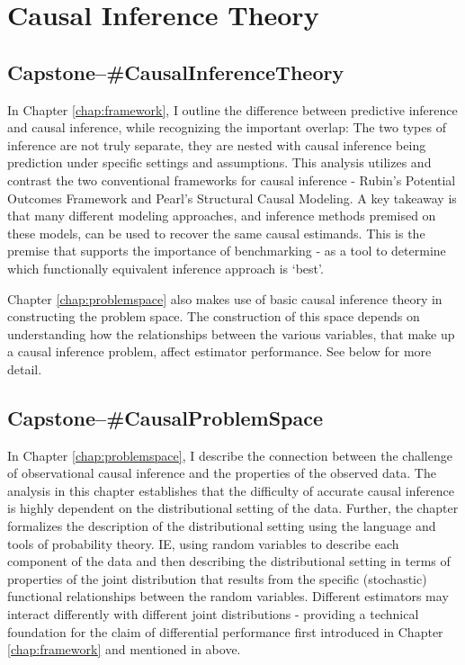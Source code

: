 \documentclass[../main.tex]{subfiles}
\begin{document}
\section{Causal Inference Theory}

\subsection*{\textbf{Capstone--\#CausalInferenceTheory}}
\label{lo:CausalInferenceTheory}

In Chapter \ref{chap:framework}, I outline the difference between predictive inference and causal inference, while recognizing the important overlap: The two types of inference are not truly separate, they are nested with causal inference being prediction under specific settings and assumptions. This analysis utilizes and contrast the two conventional frameworks for causal inference - Rubin’s Potential Outcomes Framework and Pearl’s Structural Causal Modeling. A key takeaway is that many different modeling approaches, and inference methods premised on these models, can be used to recover the same causal estimands. This is the premise that supports the importance of benchmarking - as a tool to determine which functionally equivalent inference approach is `best'.

\vspace{\baselineskip}

Chapter \ref{chap:problemspace} also makes use of basic causal inference theory in constructing the problem space. The construction of this space depends on understanding how the relationships between the various variables, that make up a causal inference problem, affect estimator performance. See  below for more detail.


\subsection*{\textbf{Capstone--\#CausalProblemSpace}}
\label{lo:CausalProblemSpace}

In Chapter \ref{chap:problemspace}, I describe the connection between the challenge of observational causal inference and the properties of the observed data. The analysis in this chapter establishes that the difficulty of accurate causal inference is highly dependent on the distributional setting of the data. Further, the chapter formalizes the description of the distributional setting using the language and tools of probability theory. IE, using random variables to describe each component of the data and then describing the distributional setting in terms of properties of the joint distribution that results from the specific (stochastic) functional relationships between the random variables. Different estimators may interact differently with different joint distributions - providing a technical foundation for the claim of differential performance first introduced in Chapter \ref{chap:framework} and mentioned in  above.
\end{document}
